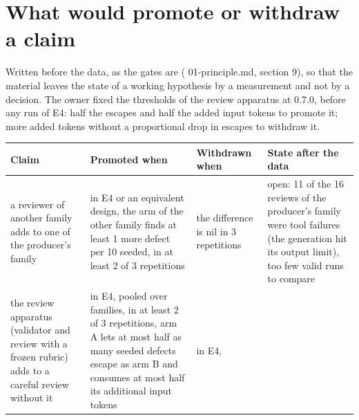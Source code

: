 \documentclass[
  american,
  10pt,
]{report}
\newcounter{none} %
\renewcommand{\texttt}[1]{{\ttfamily\hyphenchar\font=-1 #1}}
\begin{document}
\section{What would promote or withdraw a
claim}\label{what-would-promote-or-withdraw-a-claim}

Written before the data, as the gates are
(\texttt{01-\allowbreak{}principle.\allowbreak{}md}, section 9), so that
the material leaves the state of a working hypothesis by a measurement
and not by a decision. The owner fixed the thresholds of the review
apparatus at 0.7.0, before any run of E4: half the escapes and half the
added input tokens to promote it; more added tokens without a
proportional drop in escapes to withdraw it.

{\def\LTcaptype{none} %
\begin{longtable}[]{@{}
  >{\raggedright\arraybackslash}p{}
  >{\raggedright\arraybackslash}p{}
  >{\raggedright\arraybackslash}p{}
  >{\raggedright\arraybackslash}p{}@{}}
\toprule\noalign{}
\begin{minipage}[b]{\linewidth}\raggedright
Claim
\end{minipage} & \begin{minipage}[b]{\linewidth}\raggedright
Promoted when
\end{minipage} & \begin{minipage}[b]{\linewidth}\raggedright
Withdrawn when
\end{minipage} & \begin{minipage}[b]{\linewidth}\raggedright
State after the data
\end{minipage} \\
\midrule\noalign{}
\endhead
\bottomrule\noalign{}
\endlastfoot
a reviewer of another family adds to one of the producer's family & in
E4 or an equivalent design, the arm of the other family finds at least 1
more defect per 10 seeded, in at least 2 of 3 repetitions & the
difference is nil in 3 repetitions & open: 11 of the 16 reviews of the
producer's family were tool failures (the generation hit its output
limit), too few valid runs to compare \\
the review apparatus (validator and review with a frozen rubric) adds to
a careful review without it & in E4, pooled over families, in at least 2
of 3 repetitions, arm A lets at most half as many seeded defects escape
as arm B and consumes at most half its additional input tokens & in E4,

\end{longtable}}
\end{document}
